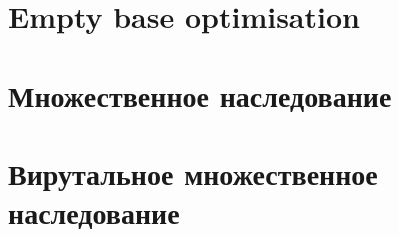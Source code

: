\documentclass{article}
\begin{document}
\newpage
\section{Empty base optimisation}
\section{Множественное наследование}
\section{Вирутальное множественное наследование}
\end{document}
